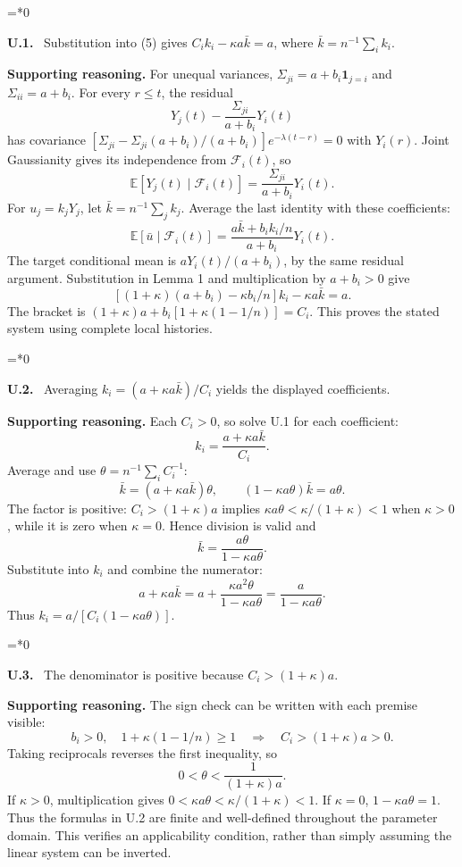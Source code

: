 \documentclass[12pt,letterpaper]{article}
\newcommand{\E}{\mathbb E}
\newcommand{\F}{\mathcal F}
\newenvironment{proofstep}[2]{%
  \begin{list}{}{\leftmargin=\dimexpr 0.17in*#2\relax%
  \setlength{\rightmargin}{0pt}\setlength{\topsep}{5pt}\setlength{\parsep}{2pt}}%
  \item[]\textbf{\textcolor{ink}{#1.}}\ }{\end{list}}
\begin{document}
\begin{proofstep}{U.1}{0}
\label{step:U.1}
Substitution into (5) gives $C_i k_i-\kappa a\bar k=a$, where $\bar k=n^{-1}\sum_i k_i$.

\textbf{Supporting reasoning.}
For unequal variances, $\Sigma_{ji}=a+b_i\mathbf1_{j=i}$ and $\Sigma_{ii}=a+b_i$. For every $r\le t$, the residual
\[
Y_j(t)-\frac{\Sigma_{ji}}{a+b_i}Y_i(t)
\]
has covariance $[\Sigma_{ji}-\Sigma_{ji}(a+b_i)/(a+b_i)]e^{-\lambda(t-r)}=0$ with $Y_i(r)$. Joint Gaussianity gives its independence from $\F_i(t)$, so
\[
\E[Y_j(t)\mid\F_i(t)]=\frac{\Sigma_{ji}}{a+b_i}Y_i(t).
\]
For $u_j=k_jY_j$, let $\bar k=n^{-1}\sum_jk_j$. Average the last identity with these coefficients:
\[
\E[\bar u\mid\F_i(t)]
=\frac{a\bar k+b_ik_i/n}{a+b_i}Y_i(t).
\]
The target conditional mean is $aY_i(t)/(a+b_i)$, by the same residual argument. Substitution in Lemma 1 and multiplication by $a+b_i>0$ give
\[
[(1+\kappa)(a+b_i)-\kappa b_i/n]k_i-\kappa a\bar k=a.
\]
The bracket is $(1+\kappa)a+b_i[1+\kappa(1-1/n)]=C_i$. This proves the stated system using complete local histories.
\par{}
\end{proofstep}

\begin{proofstep}{U.2}{0}
\label{step:U.2}
Averaging $k_i=(a+\kappa a\bar k)/C_i$ yields the displayed coefficients.

\textbf{Supporting reasoning.}
Each $C_i>0$, so solve U.1 for each coefficient:
\[
k_i=\frac{a+\kappa a\bar k}{C_i}.
\]
Average and use $\theta=n^{-1}\sum_iC_i^{-1}$:
\[
\bar k=(a+\kappa a\bar k)\theta,
\qquad (1-\kappa a\theta)\bar k=a\theta.
\]
The factor is positive: $C_i>(1+\kappa)a$ implies $\kappa a\theta<\kappa/(1+\kappa)<1$ when $\kappa>0$, while it is zero when $\kappa=0$. Hence division is valid and
\[
\bar k=\frac{a\theta}{1-\kappa a\theta}.
\]
Substitute into $k_i$ and combine the numerator:
\[
a+\kappa a\bar k
=a+\frac{\kappa a^2\theta}{1-\kappa a\theta}
=\frac{a}{1-\kappa a\theta}.
\]
Thus $k_i=a/[C_i(1-\kappa a\theta)]$.
\par{}
\end{proofstep}

\begin{proofstep}{U.3}{0}
\label{step:U.3}
The denominator is positive because $C_i>(1+\kappa)a$.

\textbf{Supporting reasoning.}
The sign check can be written with each premise visible:
\[
b_i>0,\quad 1+\kappa(1-1/n)\ge1
\quad\Longrightarrow\quad C_i>(1+\kappa)a>0.
\]
Taking reciprocals reverses the first inequality, so
\[
0<\theta<\frac1{(1+\kappa)a}.
\]
If $\kappa>0$, multiplication gives $0<\kappa a\theta<\kappa/(1+\kappa)<1$. If $\kappa=0$, $1-\kappa a\theta=1$. Thus the formulas in U.2 are finite and well-defined throughout the parameter domain. This verifies an applicability condition, rather than simply assuming the linear system can be inverted.
\par{}
\end{proofstep}
\end{document}
